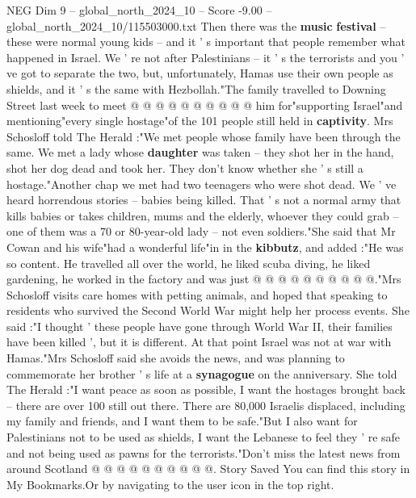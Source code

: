 \begin{textsample}{NEG Dim 9 – global\_north\_2024\_10 – Score -9.00 – global\_north\_2024\_10/115503000.txt}
Then there was the \textbf{music} \textbf{festival} -- these were normal young kids -- and it ' s important that people remember what happened in Israel.
We ' re not after Palestinians -- it ' s the terrorists and you ' ve got to separate the two, but, unfortunately, Hamas use their own people as shields, and it ' s the same with Hezbollah."The family travelled to Downing Street last week to meet @ @ @ @ @ @ @ @ @ @ him for"supporting Israel"and mentioning"every single hostage"of the 101 people still held in \textbf{captivity}.
Mrs Schosloff told The Herald :"We met people whose family have been through the same.
We met a lady whose \textbf{daughter} was taken -- they shot her in the hand, shot her dog dead and took her.
They don't know whether she ' s still a hostage."Another chap we met had two teenagers who were shot dead.
We ' ve heard horrendous stories -- babies being killed.
That ' s not a normal army that kills babies or takes children, mums and the elderly, whoever they could grab -- one of them was a 70 or 80-year-old lady -- not even soldiers."She said that Mr Cowan and his wife"had a wonderful life"in in the \textbf{kibbutz}, and added :"He was so content.
He travelled all over the world, he liked scuba diving, he liked gardening, he worked in the factory and was just @ @ @ @ @ @ @ @ @ @."Mrs Schosloff visits care homes with petting animals, and hoped that speaking to residents who survived the Second World War might help her process events.
She said :"I thought ' these people have gone through World War II, their families have been killed ', but it is different.
At that point Israel was not at war with Hamas."Mrs Schosloff said she avoids the news, and was planning to commemorate her brother ' s life at a \textbf{synagogue} on the anniversary.
She told The Herald :"I want peace as soon as possible, I want the hostages brought back -- there are over 100 still out there.
There are 80,000 Israelis displaced, including my family and friends, and I want them to be safe."But I also want for Palestinians not to be used as shields, I want the Lebanese to feel they ' re safe and not being used as pawns for the terrorists."Don't miss the latest news from around Scotland @ @ @ @ @ @ @ @ @ @.
Story Saved You can find this story in My Bookmarks.Or by navigating to the user icon in the top right.

\end{textsample}
